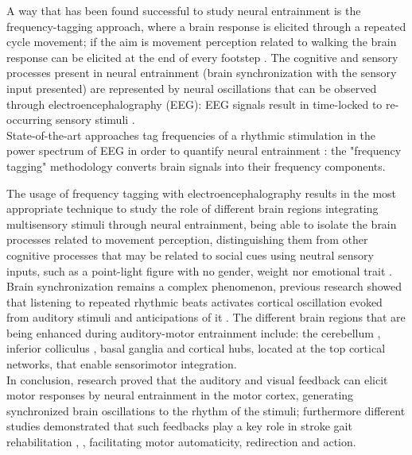 A way that has been found successful to study neural entrainment is the frequency-tagging approach, where a brain response is elicited through a repeated cycle movement; if the aim is movement perception related to walking the brain response can be elicited at the end of every footstep \parencite{Cracco_2022}. The cognitive and sensory processes present in neural entrainment (brain synchronization with the sensory input presented) are represented by neural oscillations that can be observed through electroencephalography (EEG): EEG signals result in time-locked to re-occurring sensory stimuli \parencite{Thut_2012}. \\
State-of-the-art approaches tag frequencies of a rhythmic stimulation in the power spectrum of EEG in order to quantify neural entrainment \parencite{Nozaradan_2011}: the "frequency tagging" methodology converts brain signals into their frequency components. 

The usage of frequency tagging with electroencephalography results in the most appropriate technique to study the role of different brain regions integrating multisensory stimuli through neural entrainment, being able to isolate the brain processes related to movement perception, distinguishing them from other cognitive processes that may be related to social cues using neutral sensory inputs, such as a point-light figure with no gender, weight nor emotional trait \parencite{Cracco_2022}. \\
Brain synchronization remains a complex phenomenon, previous research showed that listening to repeated rhythmic beats activates cortical oscillation evoked from auditory stimuli and anticipations of it \parencite{Snyder_2005}. The different brain regions that are being enhanced during auditory-motor entrainment include: the cerebellum \parencite{Grahn_2011}, inferior colliculus \parencite{Tierney_2013}, basal ganglia \parencite{Thaut_2009} and cortical hubs, located at the top cortical networks, that enable sensorimotor integration. \\
In conclusion, research proved that the auditory and visual feedback can elicit motor responses by neural entrainment in the motor cortex, generating synchronized brain oscillations to the rhythm of the stimuli; furthermore different studies demonstrated that such feedbacks play a key role in stroke gait rehabilitation \parencite{Chen_2018}, \parencite{Bolognini_2016}, facilitating motor automaticity, redirection and action. 

